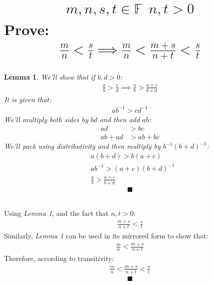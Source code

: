 \documentclass[a4paper, 12pt]{article}
\newcommand{\?}{\stackrel{?}{=}}
\newcommand{\F}{\ensuremath{\mathbb{F}}}
\newcommand{\eq}[1]{\begin{align*}#1\end{align*}}
\renewcommand{\qed}{$$\blacksquare$$}
\newtheorem{lemma}{Lemma}
\begin{document}
\section{\eq{ m,n,s,t\in{\F}~~n,t>0}Prove: \eq{\frac{m}{n}<\frac{s}{t}\implies \frac{m}{n}<\frac{m+s}{n+t}<\frac{s}{t} }}
\begin{lemma}
    We'll show that if $b,d>0$:
    \eq{\frac{a}{b}>\frac{c}{d}\implies\frac{a}{b}>\frac{a+c}{b+d}}
    It is given that: \eq{ab^{-1}>cd^{-1}}
    We'll multiply both sides by $bd$ and then add $ab$:
    \eq{
        ad&>bc\\
        ab+ad&>ab+bc
    }
    We'll pack using distributivity and then multiply by $b^{-1}(b+d)^{-1}$:
    \eq{
        &a(b+d)>b(a+c)\\
        &ab^{-1}>(a+c)(b+d)^{-1}\\
        &\frac{a}{b}>\frac{a+c}{b+d}
        }
    \qed
\end{lemma}
~\\Using \textit{Lemma 1}, and the fact that $n,t>0$: \eq{\frac{m+s}{n+t}<\frac{s}{t}}
Similarly, \textit{Lemma 1} can be used in its mirrored form to show that: \eq{\frac{m}{n}<\frac{m+s}{n+t}}
Therefore, according to transitivity: \eq{\frac{m}{n}<\frac{m+s}{n+t}<\frac{s}{t}}
\qed

\setcounter{section}{7}
\end{document}
